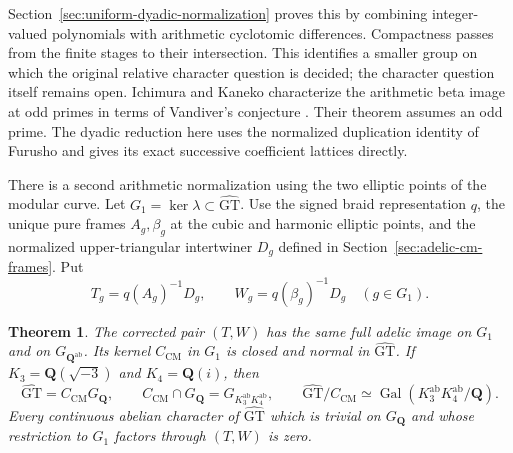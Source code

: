 \documentclass[11pt,a4paper]{article}
\newtheorem{theorem}{Theorem}[section]
\theoremstyle{definition}
\theoremstyle{remark}
\newcommand{\GT}{\widehat{\mathrm{GT}}}
\newcommand{\Q}{\mathbf Q}
\newcommand{\GQ}{G_{\Q}}
\newcommand{\ab}{\mathrm{ab}}
\DeclareMathOperator{\Gal}{Gal}
\begin{document}
Section~\ref{sec:uniform-dyadic-normalization} proves this by combining
integer-valued polynomials with arithmetic cyclotomic differences.
Compactness passes from the finite stages to their intersection.
This identifies a smaller group on which the original relative
character question is decided; the character question itself remains
open. Ichimura and Kaneko characterize the arithmetic beta image at
odd primes in terms of Vandiver's conjecture
\cite[Section~1.2, pp.~314--315, Theorem~1]{IchimuraKaneko1989}.
Their theorem assumes an odd prime. The dyadic reduction here uses
the normalized duplication identity of Furusho and gives its exact
successive coefficient lattices directly.

There is a second arithmetic normalization using the two elliptic
points of the modular curve.  Let $G_1=\ker\lambda\subset\GT$.
Use the signed braid representation $q$, the unique pure frames
$A_g,\beta_g$ at the cubic and harmonic elliptic points, and the
normalized upper-triangular intertwiner $D_g$ defined in
Section~\ref{sec:adelic-cm-frames}.  Put
\[
 T_g=q(A_g)^{-1}D_g,\qquad W_g=q(\beta_g)^{-1}D_g
                       \quad(g\in G_1).
\]

\begin{theorem}\label{thm:main-cm-normalization}
The corrected pair $(T,W)$ has the same full adelic image on $G_1$
and on $G_{\Q^{\ab}}$.  Its kernel $C_{\mathrm{CM}}$ in $G_1$
is closed and normal in $\GT$.  If
$K_3=\Q(\sqrt{-3})$ and $K_4=\Q(i)$, then
\[
 \GT=C_{\mathrm{CM}}\GQ,\qquad
 C_{\mathrm{CM}}\cap\GQ=G_{K_3^{\ab}K_4^{\ab}},\qquad
 \GT/C_{\mathrm{CM}}\simeq
       \Gal(K_3^{\ab}K_4^{\ab}/\Q).
\]
Every continuous abelian character of $\GT$ which is trivial on
$\GQ$ and whose restriction to $G_1$ factors through $(T,W)$ is zero.
\end{theorem}
\end{document}
